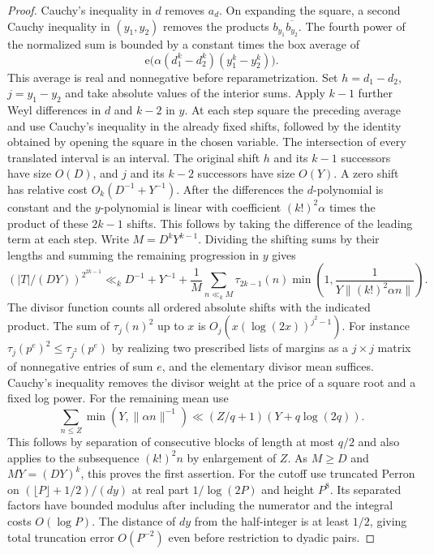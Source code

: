 \documentclass[11pt,letterpaper]{article}
\theoremstyle{definition}
\newcommand{\e}{\mathrm e}
\begin{document}
\begin{proof}
Cauchy's inequality in $d$ removes $a_d$. On expanding the square,
a second Cauchy inequality in $(y_1,y_2)$ removes the products
$b_{y_1}\overline{b_{y_2}}$. The fourth power of the normalized
sum is bounded by a constant times the box average of
\[
 \e\bigl(\alpha(d_1^k-d_2^k)(y_1^k-y_2^k)\bigr).
\]
This average is real and nonnegative before reparametrization. Set
$h=d_1-d_2$, $j=y_1-y_2$ and take absolute values of the interior sums.
Apply $k-1$ further Weyl differences in $d$ and $k-2$ in $y$. At each
step square the preceding average and use Cauchy's inequality in the
already fixed shifts, followed by the identity obtained by opening the
square in the chosen variable. The intersection of every translated
interval is an interval. The original shift $h$ and its $k-1$ successors
have size $O(D)$, and $j$ and its $k-2$ successors have size $O(Y)$.
A zero shift has relative cost $O_k(D^{-1}+Y^{-1})$. After the
differences the $d$-polynomial is constant and the $y$-polynomial is
linear with coefficient $(k!)^2\alpha$ times the product of these
$2k-1$ shifts. This follows by taking the difference of the leading
term at each step. Write $M=D^kY^{k-1}$. Dividing the shifting sums
by their lengths and summing the remaining progression in $y$ gives
\[
 (|T|/(DY))^{2^{2k-1}}\ll_k D^{-1}+Y^{-1}+
 \frac1M\sum_{n\ll_k M}\tau_{2k-1}(n)
       \min\!\left(1,\frac1{Y\|(k!)^2\alpha n\|}\right).
\]
The divisor function counts all ordered absolute shifts with the
indicated product. The sum of $\tau_j(n)^2$ up to $x$ is
$O_j(x(\log(2x))^{j^2-1})$. For instance
$\tau_j(p^e)^2\le\tau_{j^2}(p^e)$ by realizing two prescribed lists of
margins as a $j\times j$ matrix of nonnegative entries of sum $e$,
and the elementary divisor mean suffices. Cauchy's inequality removes
the divisor weight at the price of a square root and a fixed log
power. For the remaining mean use
\[
 \sum_{n\le Z}\min(Y,\|\alpha n\|^{-1})
 \ll (Z/q+1)(Y+q\log(2q)).
\]
This follows by separation of consecutive blocks of length at most
$q/2$ and also applies to the subsequence $(k!)^2n$ by enlargement of
$Z$. As $M\ge D$ and $MY=(DY)^k$, this proves the first assertion.
For the cutoff use truncated Perron on
$(\lfloor P\rfloor+1/2)/(dy)$ at real part $1/\log(2P)$ and height
$P^8$. Its separated factors have bounded modulus after including
the numerator and the integral costs $O(\log P)$. The distance of
$dy$ from the half-integer is at least $1/2$, giving total truncation
error $O(P^{-2})$ even before restriction to dyadic pairs.
\end{proof}
\end{document}
